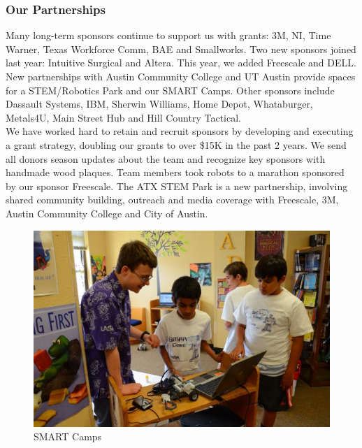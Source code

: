 \subsubsection{Our Partnerships}
Many long-term sponsors continue to support us with grants: 3M, NI, Time Warner, Texas Workforce Comm, BAE and Smallworks. Two new sponsors joined last year: Intuitive Surgical and Altera. This year, we added Freescale and DELL. New partnerships with Austin Community College and UT Austin provide spaces for a STEM/Robotics Park and our SMART Camps. Other sponsors include Dassault Systems, IBM, Sherwin Williams, Home Depot, Whataburger, Metals4U, Main Street Hub and Hill Country Tactical.\\

We have worked hard to retain and recruit sponsors by developing and executing a grant strategy, doubling our grants to over \$15K in the past 2 years. We send all donors season updates about the team and recognize key sponsors with handmade wood plaques. Team members took robots to a marathon sponsored by our sponsor Freescale. The ATX STEM Park is a new partnership, involving shared community building, outreach and media coverage with Freescale, 3M, Austin Community College and City of Austin.\\

\begin{figure}[H]
	\centering
	\includegraphics[height=0.3\linewidth]{smart2}
	\caption[]{SMART Camps}
	\label{fig:smart2}
\end{figure}

